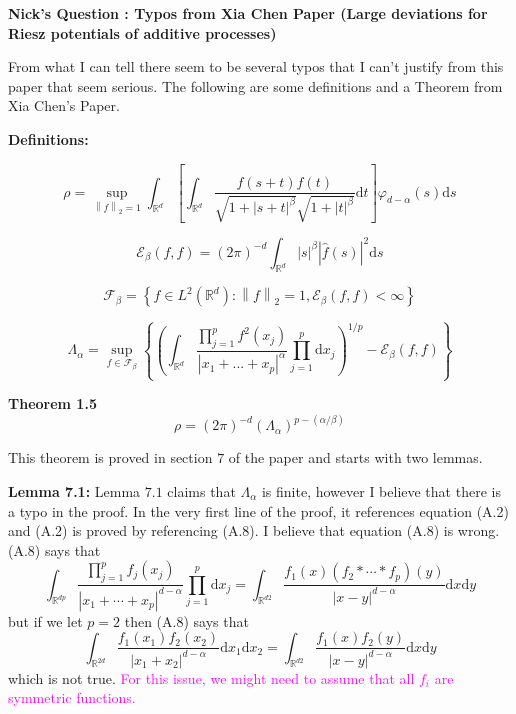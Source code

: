\documentclass[a4paper,11pt]{article}
\numberwithin{equation}{section}
\theoremstyle{plain}
\theoremstyle{definition}
\newcommand{\ud}{\ensuremath{\mathrm{d} }}
\newcommand{\Norm}[1]{\left\|  #1   \right\|}
\newcommand{\R}{\mathbb{R}}
\newcounter{NQ}
\newenvironment{NickQuestion}[1][] %
{\refstepcounter{NQ}
	\begin{mdframed}[backgroundcolor=lightgray]\textbf{Nick's Question \theNQ \: #1~~}~~~\noindent}%
	{\end{mdframed}}
\numberwithin{NQ}{section}
\numberwithin{LQ}{section}
\numberwithin{ZQ}{section}
\begin{document}
	\begin{NickQuestion}[ : Typos from Xia Chen Paper (Large deviations for Riesz potentials of additive processes) ]

		From what I can tell there seem to be several typos that I can't justify from this paper that seem serious. The following are some definitions and a Theorem from Xia Chen's Paper.

		\textbf{Definitions:}

		\begin{equation}
		\rho = \sup_{\Norm{f}_2 =1}\int_{\R^d} \left[ \int_{\R^d} \frac{f(s + t)f(t)}{\sqrt{1 + |s+t|^\beta}\sqrt{1+|t|^\beta}}\ud t \right] \varphi_{d-\alpha}(s) \ud s
		\end{equation}

		\begin{equation}
		\mathcal{E}_\beta(f,f) = (2\pi)^{-d}\int_{\R^d} |s|^\beta|\hat{f}(s)|^2 \ud s
		\end{equation}

		\begin{equation}
		\mathcal{F}_\beta = \left\{  f \in L^2(\R^d) : \Norm{f}_2 =1, \mathcal{E}_\beta(f,f) < \infty \right\}
		\end{equation}

		\begin{equation}
		\Lambda_{\alpha} = \sup_{f \in \mathcal{F}_\beta} \left\{ \left( \int_{\R^d} \frac{\prod_{j = 1}^p f^2(x_j)}{|x_1+...+x_p|^\alpha} \prod_{j = 1}^p \ud x_j \right)^{1/p} - \mathcal{E}_\beta(f,f) \right\}
		\end{equation}

		\textbf{Theorem 1.5}
		\[
		\rho = (2\pi)^{-d}(\Lambda_{\alpha})^{p-(\alpha/\beta)}
		\]

		This theorem is proved in section $7$ of the paper and starts with two lemmas.

		\noindent \textbf{Lemma 7.1:} Lemma $7.1$ claims that $\Lambda_{\alpha}$ is finite, however I believe that there is a typo in the proof. In the very first line of the proof, it references equation (A.2) and (A.2) is proved by referencing (A.8). I believe that equation (A.8) is wrong. (A.8) says that
		\[
		\int_{\R^{dp}}\frac{\prod_{j = 1}^pf_j(x_j)}{|x_1+\cdots+x_p|^{d-\alpha}} \prod_{j = 1}^p \ud x_j =
		\int_{\R^{d2}}\frac{f_1(x)(f_2*\cdots * f_p)(y)}{|x-y|^{d-\alpha}}  \ud x \ud y
		\]
		but if we let $p=2$ then (A.8) says that
		\[
		\int_{\R^{2d}}\frac{f_1(x_1)f_2(x_2)}{|x_1+x_2|^{d-\alpha}}  \ud x_1 \ud x_2  =
		\int_{\R^{d2}}\frac{f_1(x)f_2(y)}{|x-y|^{d-\alpha}}  \ud x \ud y
		\]
		which is not true.  \textcolor{magenta}{For this issue, we might need to assume that all $f_i$ are symmetric functions.}


\end{NickQuestion}
\end{document}
